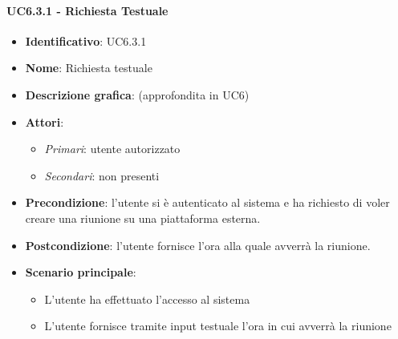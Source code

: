 \paragraph{UC6.3.1 - Richiesta Testuale}
\begin{itemize}
   \item \textbf{Identificativo}: UC6.3.1
   \item \textbf{Nome}: Richiesta testuale
   \item \textbf{Descrizione grafica}: (approfondita in UC6)
   \item \textbf{Attori}:
   \begin{itemize} 
       \item \textit{Primari}: utente autorizzato
       \item \textit{Secondari}: non presenti
   \end{itemize}
       \item \textbf{Precondizione}: l'utente si è autenticato al sistema e ha richiesto di voler creare una riunione su una piattaforma esterna.
       \item \textbf{Postcondizione}: l'utente fornisce l'ora alla quale avverrà la riunione.
    \item \textbf{Scenario principale}: 
       \begin{itemize}
           \item L'utente ha effettuato l'accesso al sistema 
           \item L'utente fornisce tramite input testuale l'ora in cui avverrà la riunione
       \end{itemize}
\end{itemize}

